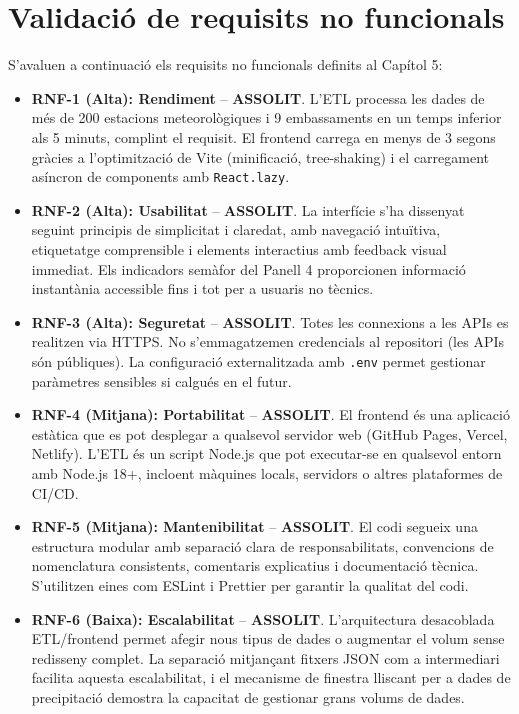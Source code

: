 
\section{Validació de requisits no funcionals}

S'avaluen a continuació els requisits no funcionals definits al Capítol 5:

\begin{itemize}
    \item \textbf{RNF-1 (Alta): Rendiment} -- \textbf{ASSOLIT}. L'ETL processa les dades de més de 200 estacions meteorològiques i 9 embassaments en un temps inferior als 5 minuts, complint el requisit. El frontend carrega en menys de 3 segons gràcies a l'optimització de Vite (minificació, tree-shaking) i el carregament asíncron de components amb \texttt{React.lazy}.
    
    \item \textbf{RNF-2 (Alta): Usabilitat} -- \textbf{ASSOLIT}. La interfície s'ha dissenyat seguint principis de simplicitat i claredat, amb navegació intuïtiva, etiquetatge comprensible i elements interactius amb feedback visual immediat. Els indicadors semàfor del Panell 4 proporcionen informació instantània accessible fins i tot per a usuaris no tècnics.
    
    \item \textbf{RNF-3 (Alta): Seguretat} -- \textbf{ASSOLIT}. Totes les connexions a les APIs es realitzen via HTTPS. No s'emmagatzemen credencials al repositori (les APIs són públiques). La configuració externalitzada amb \texttt{.env} permet gestionar paràmetres sensibles si calgués en el futur.
    
    \item \textbf{RNF-4 (Mitjana): Portabilitat} -- \textbf{ASSOLIT}. El frontend és una aplicació estàtica que es pot desplegar a qualsevol servidor web (GitHub Pages, Vercel, Netlify). L'ETL és un script Node.js que pot executar-se en qualsevol entorn amb Node.js 18+, incloent màquines locals, servidors o altres plataformes de CI/CD.
    
    \item \textbf{RNF-5 (Mitjana): Mantenibilitat} -- \textbf{ASSOLIT}. El codi segueix una estructura modular amb separació clara de responsabilitats, convencions de nomenclatura consistents, comentaris explicatius i documentació tècnica. S'utilitzen eines com ESLint i Prettier per garantir la qualitat del codi.
    
    \item \textbf{RNF-6 (Baixa): Escalabilitat} -- \textbf{ASSOLIT}. L'arquitectura desacoblada ETL/frontend permet afegir nous tipus de dades o augmentar el volum sense redisseny complet. La separació mitjançant fitxers JSON com a intermediari facilita aquesta escalabilitat, i el mecanisme de finestra lliscant per a dades de precipitació demostra la capacitat de gestionar grans volums de dades.
\end{itemize}

